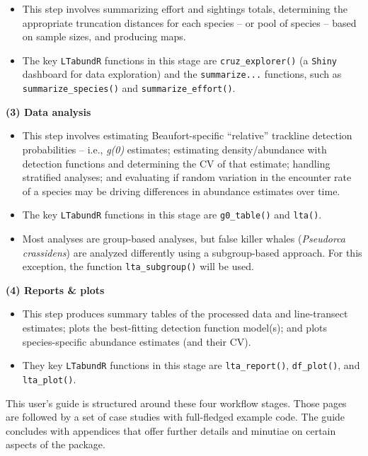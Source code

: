 \documentclass[
]{book}
\begin{document}
\begin{itemize}
\item
  This step involves summarizing effort and sightings totals, determining the appropriate truncation distances for each species -- or pool of species -- based on sample sizes, and producing maps.
\item
  The key \texttt{LTabundR} functions in this stage are \texttt{cruz\_explorer()} (a \texttt{Shiny} dashboard for data exploration) and the \texttt{summarize...} functions, such as \texttt{summarize\_species()} and \texttt{summarize\_effort()}.
\end{itemize}

\textbf{(3) Data analysis}

\begin{itemize}
\item
  This step involves estimating Beaufort-specific ``relative'' trackline detection probabilities -- i.e., \emph{g(0)} estimates; estimating density/abundance with detection functions and determining the CV of that estimate; handling stratified analyses; and evaluating if random variation in the encounter rate of a species may be driving differences in abundance estimates over time.
\item
  The key \texttt{LTabundR} functions in this stage are \texttt{g0\_table()} and \texttt{lta()}.
\item
  Most analyses are group-based analyses, but false killer whales (\emph{Pseudorca crassidens}) are analyzed differently using a subgroup-based approach. For this exception, the function \texttt{lta\_subgroup()} will be used.
\end{itemize}

\textbf{(4) Reports \& plots}

\begin{itemize}
\item
  This step produces summary tables of the processed data and line-transect estimates; plots the best-fitting detection function model(s); and plots species-specific abundance estimates (and their CV).
\item
  They key \texttt{LTabundR} functions in this stage are \texttt{lta\_report()}, \texttt{df\_plot()}, and \texttt{lta\_plot()}.
\end{itemize}

This user's guide is structured around these four workflow stages. Those pages are followed by a set of case studies with full-fledged example code. The guide concludes with appendices that offer further details and minutiae on certain aspects of the package.
\end{document}
